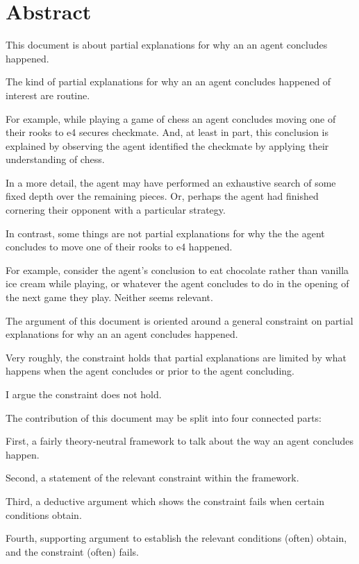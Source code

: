 \chapter*{Abstract}
\label{cha:abstract}

\begin{note}
  This document is about partial explanations for why an \eiw{} an agent concludes happened.
\end{note}

\begin{note}
  The kind of partial explanations for why an \eiw{} an agent concludes happened of interest are routine.

  For example, while playing a game of chess an agent concludes moving one of their rooks to e4 secures checkmate.
  And, at least in part, this conclusion is explained by observing the agent identified the checkmate by applying their understanding of chess.

  In a more detail, the agent may have performed an exhaustive search of some fixed depth over the remaining pieces.
  Or, perhaps the agent had finished cornering their opponent with a particular strategy.
\end{note}

\begin{note}
  In contrast, some things are not partial explanations for why the \eiw{} the agent concludes to move one of their rooks to e4 happened.

  For example, consider the agent's conclusion to eat chocolate rather than vanilla ice cream while playing, or whatever the agent concludes to do in the opening of the next game they play.
  Neither seems relevant.
\end{note}

\begin{note}
  The argument of this document is oriented around a general constraint on partial explanations for why an \eiw{} an agent concludes happened.

  Very roughly, the constraint holds that partial explanations are limited by what happens when the agent concludes or prior to the agent concluding.

  I argue the constraint does not hold.
\end{note}

\begin{note}
  The contribution of this document may be split into four connected parts:

  First, a fairly theory-neutral framework to talk about the way  an agent concludes happen.

  Second, a statement of the relevant constraint within the framework.

  Third, a deductive argument which shows the constraint fails when certain conditions obtain.

  Fourth, supporting argument to establish the relevant conditions (often) obtain, and the constraint (often) fails.
\end{note}



